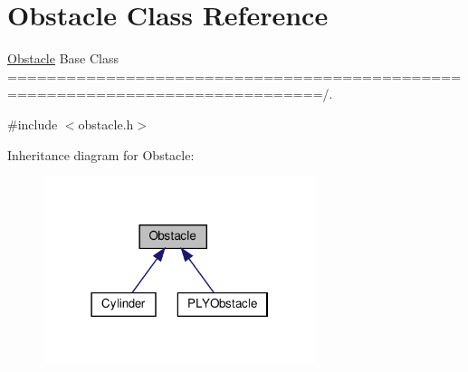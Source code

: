 \hypertarget{class_obstacle}{}\section{Obstacle Class Reference}
\label{class_obstacle}


\hyperlink{class_obstacle}{Obstacle} Base Class ==============================================================================/.  




{\ttfamily \#include $<$obstacle.\+h$>$}



Inheritance diagram for Obstacle\+:
\nopagebreak
\begin{figure}[H]
\begin{center}
\leavevmode
\includegraphics[width=226pt]{class_obstacle__inherit__graph}
\end{center}
\end{figure}
